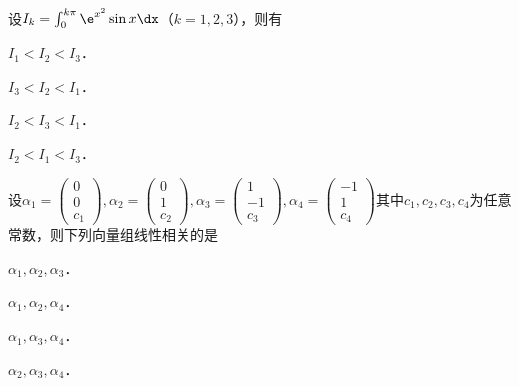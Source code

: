 \documentclass[plain,noanswer,medmath]{../../template/jnuexam}
\begin{document}
\begin{problem}
设$I_k = \int_0^{k\pi} \e^{x^{2}} \sin x\dx$（$k = 1,2,3$），则有\pickout{}
\begin{abcd}
\item $I_1 < I_2 < I_3$．
\item $I_3 < I_2 < I_1$．
\item $I_2 < I_3 < I_1$．
\item $I_2 < I_1 < I_3$．
\end{abcd}
\end{problem}


\begin{problem}
设$\alpha_1 = \begin{pmatrix}
  0 \\
  0 \\
  c_1
\end{pmatrix},\alpha_2 = \begin{pmatrix}
  0 \\
  1 \\
  c_2
\end{pmatrix},\alpha_3 = \begin{pmatrix}
  1 \\
  -1 \\
  c_3
\end{pmatrix},\alpha_4 = \begin{pmatrix}
  -1 \\
  1 \\
  c_4
\end{pmatrix}$其中$c_1,c_2,c_3,c_4$为任意常数，则下列向量组线性相关的是\pickout{}
\begin{abcd}
\item $\alpha_1,\alpha_2,\alpha_3$．
\item $\alpha_1,\alpha_2,\alpha_4$．
\item $\alpha_1,\alpha_3,\alpha_4$．
\item $\alpha_2,\alpha_3,\alpha_4$．
\end{abcd}
\end{problem}
\end{document}
